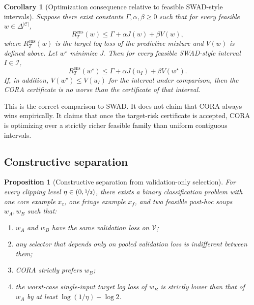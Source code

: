 \documentclass{article}
\newtheorem{proposition}{Proposition}
\newtheorem{corollary}{Corollary}
\newcommand{\cC}{\mathcal{C}}
\newcommand{\cV}{\mathcal{V}}
\newcommand{\cI}{\mathcal{I}}
\newcommand{\cora}{\textup{\textsc{CORA}}}
\newcommand{\swad}{\textup{\textsc{SWAD}}}
\newcommand{\simplex}{\Delta}
\begin{document}
\begin{corollary}[Optimization consequence relative to feasible \swad-style intervals]
\label{thm:domination}
Suppose there exist constants $\Gamma,\alpha,\beta \ge 0$ such that for every feasible $w\in\simplex^{|\cC|}$,
\begin{equation}
    R_T^{\mathrm{ens}}(w)
    \le
    \Gamma
    +
    \alpha J(w)
    +
    \beta V(w),
    \label{eq:dom_assump}
\end{equation}
where $R_T^{\mathrm{ens}}(w)$ is the target log loss of the predictive mixture and $V(w)$ is defined above. Let $w^\star$ minimize $J$. Then for every feasible \swad-style interval $I\in\cI$,
\begin{equation}
    R_T^{\mathrm{ens}}(w^\star)
    \le
    \Gamma
    +
    \alpha J(u_I)
    +
    \beta V(w^\star).
    \label{eq:domination}
\end{equation}
If, in addition, $V(w^\star)\le V(u_I)$ for the interval under comparison, then the \cora{} certificate is no worse than the certificate of that interval.
\end{corollary}

This is the correct comparison to \swad{}. It does not claim that \cora{} always wins empirically. It claims that once the target-risk certificate is accepted, \cora{} is optimizing over a strictly richer feasible family than uniform contiguous intervals.

\subsection{Constructive separation}

\begin{proposition}[Constructive separation from validation-only selection]
\label{thm:separation}
For every clipping level $\eta \in (0,\nicefrac{1}{2})$, there exists a binary classification problem with one core example $x_c$, one fringe example $x_f$, and two feasible post-hoc soups $w_A,w_B$ such that:
\begin{enumerate}[leftmargin=1.4em]
    \item $w_A$ and $w_B$ have the same validation loss on $\cV$;
    \item any selector that depends only on pooled validation loss is indifferent between them;
    \item \cora{} strictly prefers $w_B$;
    \item the worst-case single-input target log loss of $w_B$ is strictly lower than that of $w_A$ by at least $\log(1/\eta)-\log 2$.
\end{enumerate}
\end{proposition}
\end{document}
